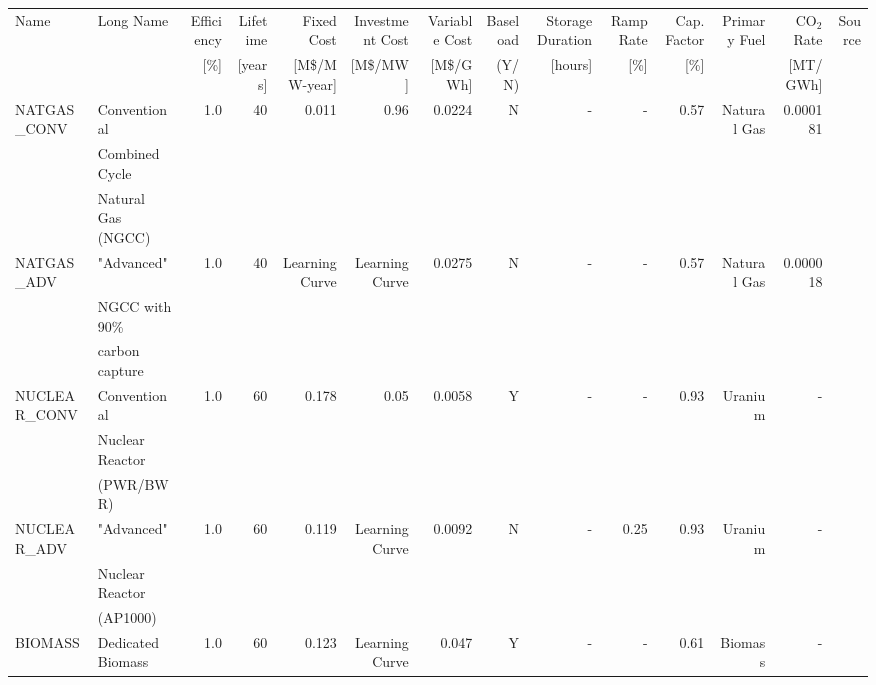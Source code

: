 \begin{tabular}{llrrrrrrrrrrrr}
\toprule
        Name &                                          Long Name &  Efficiency &  Lifetime & Fixed Cost & Investment Cost& Variable Cost & Baseload & Storage Duration & Ramp Rate & Cap. Factor & Primary Fuel &  CO$_2$ Rate & Source \\
        &  & [\%]  & [years] & [M\$/MW-year] & [M\$/MW] & [M\$/GWh] &(Y/N) & [hours] & [\%] & [\%] & & [MT/GWh] &  \\
\midrule
 NATGAS\_CONV &     Conventional   &         1.0 &        40 &                   0.011 &                    0.96 &                 0.0224 &               N &                      - &       - &                0.57 &  Natural Gas &                     0.000181 &   \cite{sargent__lundy_capital_2020}     \\
 &Combined Cycle&&&&&&&&&&&&\\
 &Natural Gas (NGCC)&&&&&&&&&&&&\\
  NATGAS\_ADV &            "Advanced"   &         1.0 &        40 &                      Learning Curve &                      Learning Curve &                 0.0275 &               N &                      - &       - &                0.57 &  Natural Gas &                     0.000018 &    \cite{nrel_2020_2020}    \\
  &NGCC with 90\%&&&&&&&&&&&&\\
  &carbon capture&&&&&&&&&&&&\\
NUCLEAR\_CONV &             Conventional   &         1.0 &        60 &                   0.178 &                    0.05 &                 0.0058 &               Y &                      - &       - &                0.93 &      Uranium &                     - &  \cite{desai_nuclear_2020,nei_status_2010}      \\
&Nuclear Reactor&&&&&&&&&&&&\\
&(PWR/BWR)&&&&&&&&&&&&\\
 NUCLEAR\_ADV &                "Advanced"   &         1.0 &        60 &                      0.119 &                      Learning Curve &                 0.0092 &               N &                      - &      0.25 &                0.93 &      Uranium &                     - &   \cite{nrel_2020_2020}     \\
 &Nuclear Reactor&&&&&&&&&&&&\\
 &(AP1000)&&&&&&&&&&&&\\
     BIOMASS &                            Dedicated Biomass  &         1.0 &        60 &                      0.123 &                      Learning Curve &                  0.047 &               Y &                      - &       - &                0.61 &      Biomass &                     - &       \cite{nrel_2020_2020} \\

\end{tabular}

